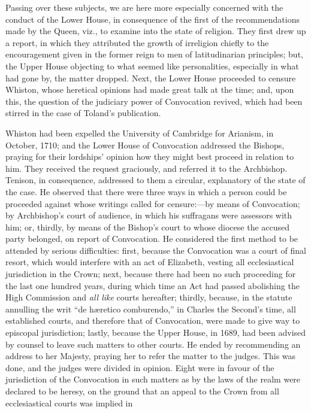 Passing over these subjects,
we are here more especially concerned with the conduct of the Lower
House, in consequence of the first of the recommendations made by the
Queen, viz., to examine into the state of religion. They first drew up
a report, in which they attributed the growth of irreligion chiefly to
the encouragement given in the former reign to men of latitudinarian
principles; but, the Upper House objecting to what seemed like
personalities, especially in what had gone by, the matter dropped.
Next, the Lower House proceeded to censure Whiston, whose heretical
opinions had made great talk at the time; and, upon this, the question
of the judiciary power of Convocation revived, which had been stirred
in the case of Toland's publication.

Whiston had been expelled the
University of Cambridge for Arianism, in October, 1710; and the Lower
House of Convocation addressed the Bishops, praying for their
lordships' opinion how they might best proceed in relation to him.
They received the request graciously, and referred it to the
Archbishop. Tenison, in consequence, addressed to them a circular,
explanatory of the state of the case. He observed that there were
three ways in which a person could be proceeded against whose writings
called for censure:—by means of Convocation; by Archbishop's court
of audience, in which his suffragans were assessors with him;
or, thirdly, by means of the Bishop's court to whose diocese the
accused party belonged, on report of Convocation. He considered the
first method to be attended by serious difficulties: first, because
the Convocation was a court of final resort, which would interfere
with an act of Elizabeth, vesting all ecclesiastical jurisdiction in
the Crown; next, because there had been no such proceeding for the
last one hundred years, during which time an Act had passed abolishing
the High Commission and \emph{all like} courts hereafter; thirdly,
because, in the statute annulling the writ ``de hæretico comburendo,''
in Charles the Second's time, all established courts, and therefore
that of Convocation, were made to give way to episcopal jurisdiction;
lastly, because the Upper House, in 1689, had been advised by counsel
to leave such matters to other courts. He ended by recommending an
address to her Majesty, praying her to refer the matter to the judges.
This was done, and the judges were divided in opinion. Eight were in
favour of the jurisdiction of the Convocation in such matters as by
the laws of the realm were declared to be heresy, on the ground that
an appeal to the Crown from all ecclesiastical courts was implied in
